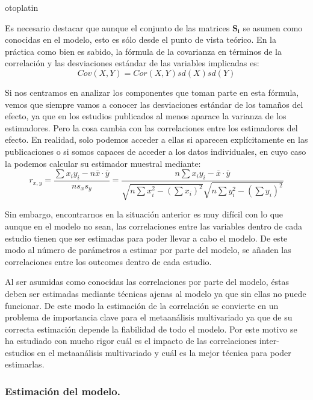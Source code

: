 otoplatin\documentclass[a4paper,openright,12pt]{report}
\begin{document}
Es necesario destacar que aunque el conjunto de las matrices $\mathbf{S_{i}}$ se asumen como conocidas en el modelo, esto es sólo desde el punto de vista teórico. En la práctica como bien es sabido, la fórmula de la covarianza en términos de la correlación y las desviaciones estándar de las variables implicadas es:
\begin{equation}
Cov\left(X,Y\right) = Cor\left(X,Y\right)sd\left(X\right)sd\left(Y\right)
\label{formula_cov}
\end{equation}

Si nos centramos en analizar los componentes que toman parte en esta fórmula, vemos que siempre vamos a conocer las desviaciones estándar de los tamaños del efecto, ya que en los estudios publicados al menos aparace la varianza de los estimadores. Pero la cosa cambia con las correlaciones entre los estimadores del efecto. En realidad, solo podemos acceder a ellas si aparecen explícitamente en las publicaciones o si somos capaces de acceder a los datos individuales, en cuyo caso la podemos calcular su estimador muestral mediante:
\begin{equation}
r_{x,y}= \frac{\sum{x_{i}y_{i}}-n\overline{x}\cdot\overline{y}}{ns_{x}s_{y}}=\frac{n\sum{x_{i}y_{i}}-\overline{x}\cdot\overline{y}}{\sqrt{n\sum x_{i}^{2}-\left(\sum x_{i}\right)^2}\sqrt{n\sum y_{i}^{2}-\left(\sum y_{i}\right)^2}}
\label{formula_corr}
\end{equation}

Sin embargo, encontrarnos en la situación anterior es muy difícil con lo que aunque en el modelo no sean, las correlaciones entre las variables dentro de cada estudio tienen que ser estimadas para poder llevar a cabo el modelo. De este modo al número de parámetros a estimar por parte del modelo, se añaden las correlaciones entre los outcomes dentro de cada estudio.

Al ser asumidas como conocidas las correlaciones por parte del modelo, éstas deben ser estimadas mediante técnicas ajenas al modelo ya que sin ellas no puede funcionar. De este modo la estimación de la correlación se convierte en un problema de importancia clave para el metaanálisis multivariado ya que de su correcta estimación depende la fiabilidad de todo el modelo. Por este motivo se ha estudiado con mucho rigor cuál es el impacto de las correlaciones inter-estudios en el metaanálisis multivariado y cuál es la mejor técnica para poder estimarlas.

\subsubsection{Estimación del modelo.}
\end{document}
